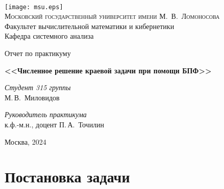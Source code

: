 \documentclass[11pt]{article}
\begin{document}
\thispagestyle{empty}

\begin{center}
\ \vspace{-3cm}

\texttt{[image: msu.eps]}\\
{\scshape Московский государственный университет имени М.~В.~Ломоносова}\\
Факультет вычислительной математики и кибернетики\\
Кафедра системного анализа

\vfill

{\LARGE Отчет по практикуму}

\vspace{1cm}

{\Huge\bfseries <<Численное решение краевой задачи при помощи БПФ>>}
\end{center}

\vspace{1cm}

\begin{flushright}
  \large
  \textit{Студент 315 группы}\\
  М.\,В.~Миловидов

  \vspace{5mm}

  \textit{Руководитель практикума}\\
  к.ф.-м.н., доцент П.\,А.~Точилин
\end{flushright}

\vfill

\begin{center}
Москва, 2024
\end{center}

\newpage
\section{Постановка задачи}
\end{document}
